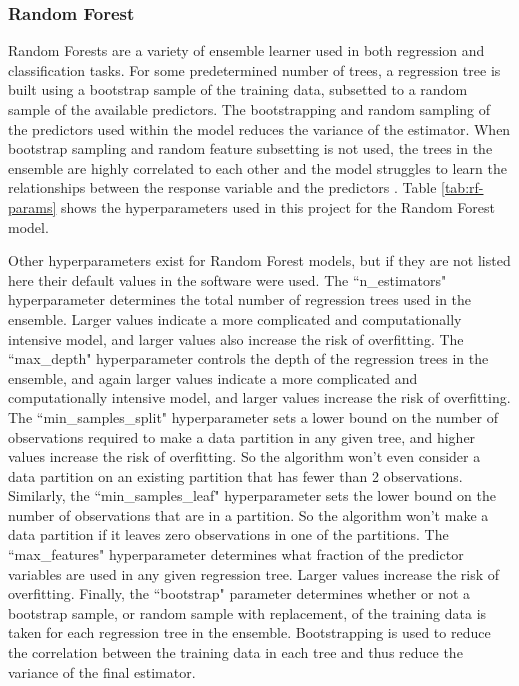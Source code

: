\subsubsection{Random Forest}
\hfill

Random Forests are a variety of ensemble learner used in both regression and classification tasks. For some predetermined number of trees, a regression tree is built using a bootstrap sample of the training data, subsetted to a random sample of the available predictors. The bootstrapping and random sampling of the predictors used within the model reduces the variance of the estimator. When bootstrap sampling and random feature subsetting is not used, the trees in the ensemble are highly correlated to each other and the model struggles to learn the relationships between the response variable and the predictors \citep[p.\ 587]{Hastie-2010-ESL}. Table \ref{tab:rf-params} shows the hyperparameters used in this project for the Random Forest model.

Other hyperparameters exist for Random Forest models, but if they are not listed here their default values in the software were used. The ``n\_estimators" hyperparameter determines the total number of regression trees used in the ensemble. Larger values indicate a more complicated and computationally intensive model, and larger values also increase the risk of overfitting. The ``max\_depth" hyperparameter controls the depth of the regression trees in the ensemble, and again larger values indicate a more complicated and computationally intensive model, and larger values increase the risk of overfitting. The ``min\_samples\_split" hyperparameter sets a lower bound on the number of observations required to make a data partition in any given tree, and higher values increase the risk of overfitting. So the algorithm won't even consider a data partition on an existing partition that has fewer than 2 observations. Similarly, the ``min\_samples\_leaf" hyperparameter sets the lower bound on the number of observations that are in a partition. So the algorithm won't make a data partition if it leaves zero observations in one of the partitions. The ``max\_features" hyperparameter determines what fraction of the predictor variables are used in any given regression tree. Larger values increase the risk of overfitting. Finally, the ``bootstrap" parameter determines whether or not a bootstrap sample, or random sample with replacement, of the training data is taken for each regression tree in the ensemble. Bootstrapping is used to reduce the correlation between the training data in each tree and thus reduce the variance of the final estimator. 


